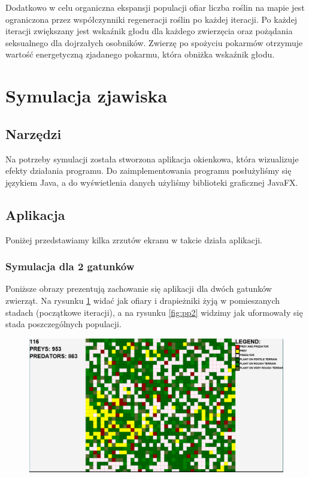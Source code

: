 Dodatkowo w celu organiczna ekspansji populacji ofiar liczba roślin na mapie jest ograniczona przez współczynniki regeneracji roślin po każdej iteracji. Po każdej iteracji zwiększany jest wskaźnik głodu dla każdego zwierzęcia oraz pożądania seksualnego dla dojrzałych osobników. Zwierzę po spożyciu pokarmów otrzymuje wartość energetyczną zjadanego pokarmu, która obniżka wskaźnik głodu.

\section{Symulacja zjawiska}

\subsection{Narzędzi}
Na potrzeby symulacji została stworzona aplikacja okienkowa, która wizualizuje efekty działania programu.
Do zaimplementowania programu posłużyliśmy się językiem Java, a do wyświetlenia danych użyliśmy biblioteki graficznej JavaFX.
\subsection{Aplikacja}
Poniżej przedstawiamy kilka zrzutów ekranu w takcie działa aplikacji.
\subsubsection{Symulacja dla 2 gatunków}
Poniższe obrazy prezentują zachowanie się aplikacji dla dwóch gatunków zwierząt. Na rysunku \ref{fig:pp1} widać jak ofiary i drapieżniki żyją w pomieszanych stadach (początkowe iteracji), a na rysunku \ref{fig:pp2} widzimy jak uformowały się stada poszczególnych populacji.

\begin{figure}[!htb]
	\centering
	\includegraphics[width=1.1\linewidth]{img/tii1}
	\caption{\label{fig:pp1} }
\end{figure}

